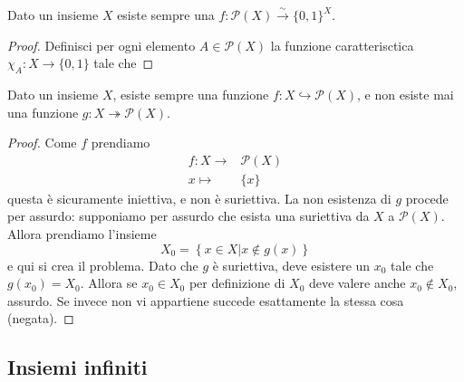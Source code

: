\documentclass[11pt]{scrartcl}
\newcommand{\parti}{\mathcal{P}}
\begin{document}
	\begin{proposition}
		Dato un insieme $X$ esiste sempre una $f:\parti(X)\xrightarrow{\sim}\{0,1\}^X$.
	\end{proposition}
	\begin{proof}
		Definisci per ogni elemento $A\in\parti(X)$ la funzione caratterisctica $\chi_A:X\to \{0,1\}$ tale che 
	\end{proof}
	
	\begin{lemma}[Cantor]
		Dato un insieme $X$, esiste sempre una funzione $f:X\hookrightarrow \parti(X)$, e non esiste mai una funzione $g:X\twoheadrightarrow \parti(X)$. 
	\end{lemma}
	\begin{proof}
		Come $f$ prendiamo 
		\begin{align*}
			f:X\to & \parti(X) \\
			  x\mapsto & \{x\}
		\end{align*}
		questa è sicuramente iniettiva, e non è suriettiva. La non esistenza di $g$ procede per assurdo: supponiamo per assurdo che esista una suriettiva da $X$ a $\parti(X)$. Allora prendiamo l'insieme 
		$$X_0=\left\{x\in X | x\not\in g(x)\right\}$$
		e qui si crea il problema. Dato che $g$ è suriettiva, deve esistere un $x_0$ tale che $g(x_0)=X_0$. Allora se $x_0\in X_0$ per definizione di $X_0$ deve valere anche $x_0 \not \in X_0$, assurdo. Se invece non vi appartiene succede esattamente la stessa cosa (negata). 
	\end{proof}
	
	\subsection{Insiemi infiniti}
	
\end{document}
